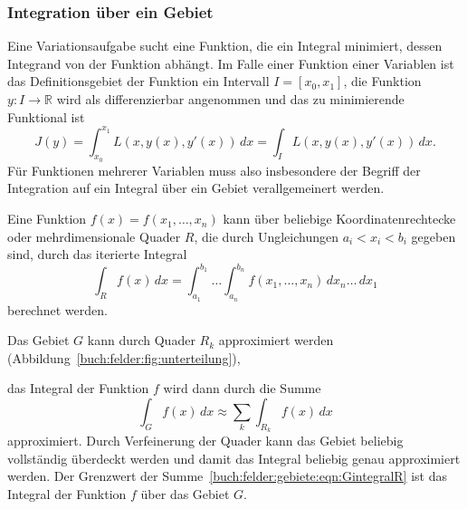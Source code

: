%
%
\subsubsection{Integration über ein Gebiet}
Eine Variationsaufgabe sucht eine Funktion, die ein Integral minimiert,
dessen Integrand von der Funktion abhängt.
Im Falle einer Funktion einer Variablen ist das Definitionsgebiet der
Funktion ein Intervall $I=[x_0,x_1]$, die Funktion $y\colon I\to\mathbb{R}$
wird als differenzierbar angenommen und das zu minimierende Funktional
ist
\[
J(y)
=
\int_{x_0}^{x_1} L(x,y(x),y'(x))\,dx
=
\int_I L(x,y(x),y'(x))\,dx.
\]
Für Funktionen mehrerer Variablen muss also insbesondere der Begriff
der Integration auf ein Integral über ein Gebiet verallgemeinert werden.

Eine Funktion $f(x) = f(x_1,\dots,x_n)$ kann über beliebige
Koordinatenrechtecke oder mehrdimensionale Quader $R$,
die durch Ungleichungen $a_i< x_i<b_i$ gegeben sind, durch das iterierte
Integral
\[
\int_R f(x)
\,dx
=
\int_{a_1}^{b_1}
\dots
\int_{a_n}^{b_n}
f(x_1,\dots,x_n)
\,dx_n
\dots
\,dx_1
\]
berechnet werden.

Das Gebiet $G$ kann durch Quader $R_k$ approximiert werden
(Abbildung~\ref{buch:felder:fig:unterteilung}),

das Integral der Funktion $f$ wird dann durch die Summe
\begin{equation}
\int_G f(x)\,dx
\approx
\sum_k
\int_{R_k} f(x)\,dx
\label{buch:felder:gebiete:eqn:GintegralR}
\end{equation}
approximiert.
Durch Verfeinerung der Quader kann das Gebiet beliebig vollständig überdeckt
werden und damit das Integral beliebig genau approximiert werden.
Der Grenzwert der Summe~\eqref{buch:felder:gebiete:eqn:GintegralR}
ist das Integral der Funktion $f$ über das Gebiet $G$.

%
%
